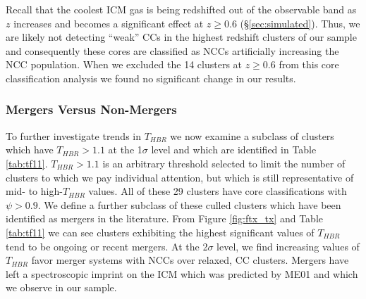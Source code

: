 \documentclass[12pt,preprint]{aastex}
\begin{document}
Recall that the coolest ICM gas is being redshifted out of the
observable band as $z$ increases and becomes a significant effect at
$z \geq 0.6$ (\S\ref{sec:simulated}). Thus, we are likely not detecting
``weak'' CCs in the highest redshift clusters of our sample and
consequently these cores are classified as NCCs artificially increasing
the NCC population. When we excluded the 14 clusters at $z \geq 0.6$
from this core classification analysis we found no significant change
in our results.

\subsubsection{Mergers Versus Non-Mergers}\label{sec:merge}

To further investigate trends in $T_{HBR}$ we now examine a subclass of
clusters which have $T_{HBR} > 1.1$ at the 1$\sigma$ level and which are
identified in Table \ref{tab:tf11}. $T_{HBR} > 1.1$ is an arbitrary
threshold selected to limit the number of clusters to which we pay
individual attention, but which is still representative of mid- to
high-$T_{HBR}$ values. All of these 29 clusters have core classifications 
with $\psi > 0.9$. We define a further subclass of these culled
clusters which have been identified as mergers in the literature. From Figure
\ref{fig:ftx_tx} and Table \ref{tab:tf11} we can see clusters
exhibiting the highest significant values of $T_{HBR}$ tend to be ongoing or
recent mergers. At the 2$\sigma$ level, we find increasing values of
$T_{HBR}$ favor merger systems with NCCs over relaxed, CC clusters. Mergers
have left a spectroscopic imprint on the ICM which was predicted by
ME01 and which we observe in our sample.
\end{document}
